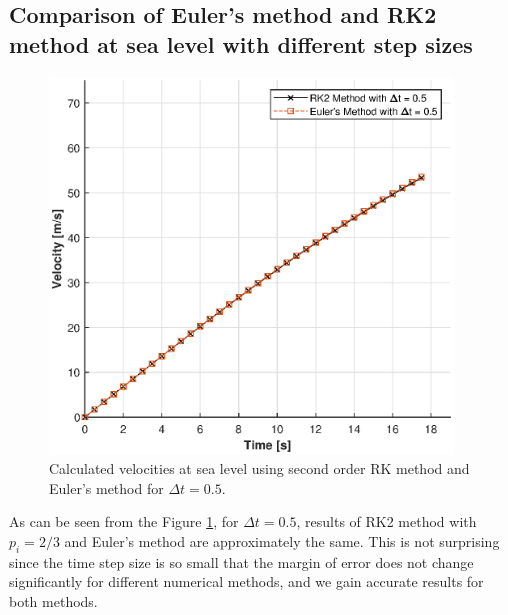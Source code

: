 \documentclass[letterpaper,12pt]{article}
\begin{document}
\subsection{Comparison of Euler's method and RK2 method at sea level with different step sizes}
\begin{figure}[ht]
        \centering \includegraphics[max height=10cm]{graphs/compare05.eps}
        \caption{Calculated velocities at sea level using second order RK method and Euler's method for $\Delta t=0.5$.}
        \label{fig:rk2_05}
\end{figure}
As can be seen from the Figure \ref{fig:rk2_05}, for $\Delta t = 0.5$, results of RK2 method with $p_i=2/3$ and Euler's method
are approximately the same. This is not surprising since the time step size is so small that the margin of error does not change
significantly for different numerical methods, and we gain accurate results for both methods.
\newpage
\end{document}

